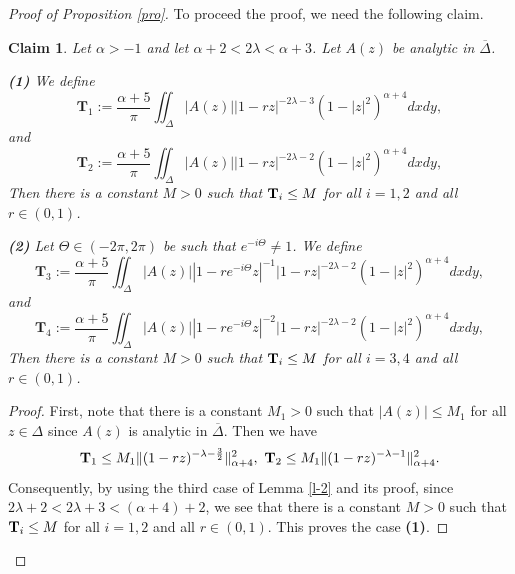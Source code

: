 \documentclass[10pt]{amsart}
\newtheorem{claim}[theorem]{Claim}
\theoremstyle{definition}    %
\numberwithin{equation}{section}
\begin{document}
\begin{proof}[Proof of Proposition \ref{pro}]
To proceed the proof, we need the following claim.
\begin{claim}\label{claim-1}
Let $\alpha>-1$ and let $\alpha+2<2\lambda<\alpha+3$. Let $A(z)$ be analytic in $\overline{\Delta}$. 

{\bf (1)} We define 
 \begin{equation}\label{c-01}
\mathbf{T}_{1}:=\frac{\alpha+5}{\pi}\iint_{\Delta}|A(z)||1-rz|^{-2\lambda-3}
(1-|z|^2)^{\alpha+4}dxdy,\nonumber
 \end{equation}   
and  
 \begin{equation}\label{c-02}
\mathbf{T}_{2}:=\frac{\alpha+5}{\pi}\iint_{\Delta}|A(z)||1-rz|^{-2\lambda-2}
(1-|z|^2)^{\alpha+4}dxdy,\nonumber \end{equation} 
Then there is a constant $M>0$ such that ${\bf T}_{i}\leq M$ for all $i=1,2$ and all $r\in (0,1)$.

{\bf (2)} Let $\Theta\in (-2\pi,2\pi)$ be such that $e^{-i\Theta}\neq 1$. We define  
 \begin{equation}\label{c-03}
\mathbf{T}_{3}:=\frac{\alpha+5}{\pi}\iint_{\Delta}|A(z)||1-re^{-i\Theta}z|^{-1}|1-rz|^{-2\lambda-2}
(1-|z|^2)^{\alpha+4}dxdy,\nonumber
 \end{equation}   
and  
 \begin{equation}\label{c-04}
\mathbf{T}_{4}:=\frac{\alpha+5}{\pi}\iint_{\Delta}|A(z)||1-re^{-i\Theta}z|^{-2}|1-rz|^{-2\lambda-2}
(1-|z|^2)^{\alpha+4}dxdy,\nonumber \end{equation} 
Then there is a constant $M>0$ such that ${\bf T}_{i}\leq M$ for all $i=3,4$ and all $r\in (0,1)$.
\end{claim}
\begin{proof}\label{claim}First, note that there is a constant $M_1>0$ such that $|A(z)|\leq M_1$ for all $z\in \Delta$ since $A(z)$ is analytic in $\overline{\Delta}$. Then we have
$${\bf T}_1\leq M_1 \|(1-rz)^{-\lambda-\frac{3}{2}}\|_{\alpha+4}^2, \,\,{\bf T}_2\leq M_1 \|(1-rz)^{-\lambda-1}\|_{\alpha+4}^2.$$
Consequently, by using the third case of Lemma \ref{l-2} and its proof, since $2\lambda+2<2\lambda+3<(\alpha+4)+2$, we see that there is a constant $M>0$ such that ${\bf T}_{i}\leq M$ for all $i=1,2$ and all $r\in (0,1)$. This proves the case {\bf (1)}.


\end{proof}
\end{proof}
\end{document}
